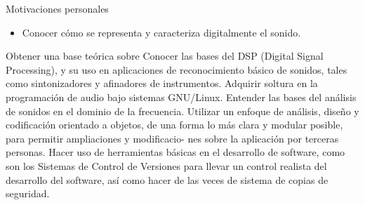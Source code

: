 \documentclass[11pt,xcolor=svgnames]{beamer}
\begin{document}
\begin{frame}{Motivaciones personales}
  \begin{itemize}
  \item Conocer cómo se representa y caracteriza digitalmente el sonido.
  \end{itemize}
Obtener una base teórica sobre 
Conocer las bases del DSP (Digital Signal Processing), y su uso en aplicaciones
de reconocimiento básico de sonidos, tales como sintonizadores y afinadores de
instrumentos.
Adquirir soltura en la programación de audio bajo sistemas GNU/Linux.
Entender las bases del análisis de sonidos en el dominio de la frecuencia.
Utilizar un enfoque de análisis, diseño y codificación orientado a objetos, de una
forma lo más clara y modular posible, para permitir ampliaciones y modificacio-
nes sobre la aplicación por terceras personas.
Hacer uso de herramientas básicas en el desarrollo de software, como son los
Sistemas de Control de Versiones para llevar un control realista del desarrollo
del software, así como hacer de las veces de sistema de copias de seguridad.

  
\end{frame}





\end{document}
